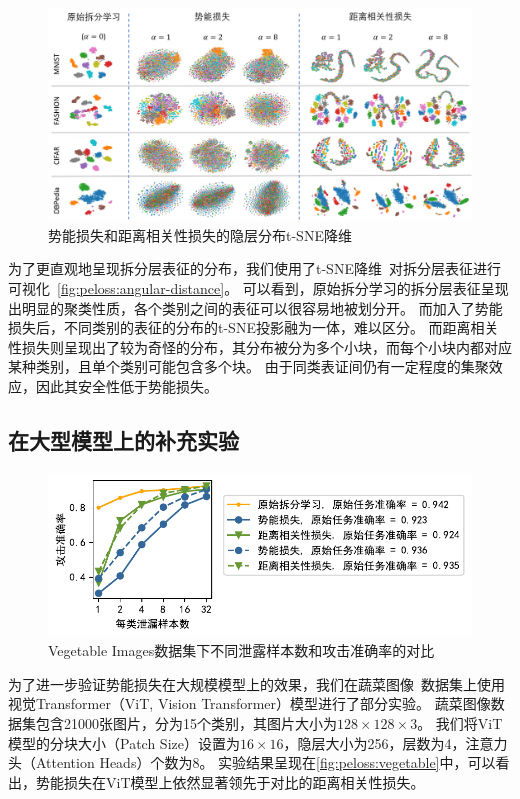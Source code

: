 \begin{figure}[h!]
    \centering
    \includegraphics[width=1\linewidth]{Z_Resources/peloss_tsne}
    \caption{势能损失和距离相关性损失的隐层分布t-SNE降维}
    \label{fig:peloss:angular-distance}
\end{figure}

为了更直观地呈现拆分层表征的分布，我们使用了t-SNE降维~\cite{van_2008_tsne}对拆分层表征进行可视化~\autoref{fig:peloss:angular-distance}。
%
可以看到，原始拆分学习的拆分层表征呈现出明显的聚类性质，各个类别之间的表征可以很容易地被划分开。
%
而加入了势能损失后，不同类别的表征的分布的t-SNE投影融为一体，难以区分。
%
而距离相关性损失则呈现出了较为奇怪的分布，其分布被分为多个小块，而每个小块内都对应某种类别，且单个类别可能包含多个块。
由于同类表证间仍有一定程度的集聚效应，因此其安全性低于势能损失。
%

\subsection{在大型模型上的补充实验}
\begin{figure}[h!]
    \centering
    \includegraphics[width=1\linewidth]{Z_Resources/peloss_vegetable-primary}
    \caption{Vegetable Images数据集下不同泄露样本数和攻击准确率的对比}
    \label{fig:peloss:vegetable}
\end{figure}
为了进一步验证势能损失在大规模模型上的效果，我们在蔬菜图像~\cite{}数据集上使用视觉Transformer（ViT, Vision Transformer）模型进行了部分实验。
%
蔬菜图像数据集包含21000张图片，分为15个类别，其图片大小为$128\times 128 \times 3$。
%
我们将ViT模型的分块大小（Patch Size）设置为$16\times 16$，隐层大小为256，层数为4，注意力头（Attention Heads）个数为8。
%
实验结果呈现在\autoref{fig:peloss:vegetable}中，可以看出，势能损失在ViT模型上依然显著领先于对比的距离相关性损失。